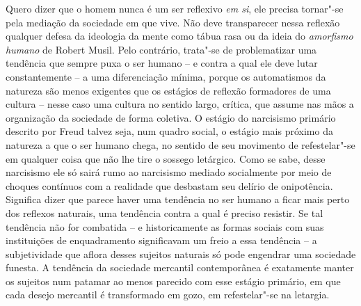 {Quero dizer que o homem nunca é um ser reflexivo \emph{em si}, ele
precisa tornar"-se pela mediação da sociedade em que vive. Não deve
transparecer nessa reflexão qualquer defesa da ideologia da mente como
tábua rasa ou da ideia do \emph{amorfismo humano} de Robert Musil. Pelo
contrário, trata"-se de problematizar uma tendência que sempre puxa o ser
humano -- e contra a qual ele deve lutar constantemente -- a uma
diferenciação mínima, porque os automatismos da natureza são menos
exigentes que os estágios de reflexão formadores de uma cultura -- nesse
caso uma cultura no sentido largo, crítica, que assume nas mãos a
organização da sociedade de forma coletiva. O estágio do
narcisismo primário descrito por Freud talvez seja, num quadro social, o
estágio mais próximo da natureza a que o ser humano chega, no sentido de
seu movimento de refestelar"-se em qualquer coisa que não lhe tire o
sossego letárgico. Como se sabe, desse narcisismo ele só sairá rumo ao
narcisismo mediado socialmente por meio de choques contínuos com a
realidade que desbastam seu delírio de onipotência. Significa dizer que
parece haver uma tendência no ser humano a ficar mais perto dos reflexos
naturais, uma tendência contra a qual é preciso resistir. Se tal
tendência não for combatida -- e historicamente as formas sociais com
suas instituições de enquadramento significavam um freio a essa
tendência -- a subjetividade que aflora desses sujeitos naturais só pode
engendrar uma sociedade funesta. A tendência da sociedade mercantil
contemporânea é exatamente manter os sujeitos num patamar ao menos
parecido com esse estágio primário, em que cada desejo mercantil é
transformado em gozo, em refestelar"-se na letargia.

}
